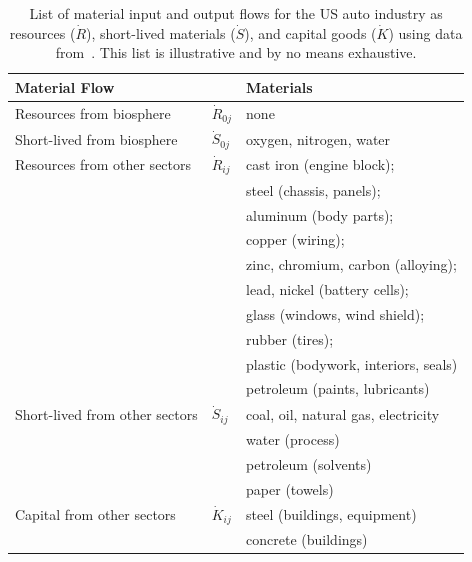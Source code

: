 \begin{table}
\caption[List of material input and output flows for the 
US auto industry]{List of material input and output flows for 
the US auto industry 
as resources ($\dot{R}$),
short-lived materials ($\dot{S}$),
and capital goods ($\dot{K}$)
using data from~\cite{Sullivan1998, MacLean1998,Schweimer2000,
McCleese2002,MacLean2003, Burnham2006,Sullivan2010, Hawkins2012}.
This list is illustrative and by no means exhaustive.}
\begin{center}
 \begin{tabular}{p{4cm}p{1cm}p{5.2cm}}
\toprule 
\textbf{Material Flow}		 		& 								& \textbf{Materials} 									\\
\midrule
Resources from biosphere		& $\dot{R}_{0j}$		& none															\\[0.15cm]
Short-lived from biosphere		&	$\dot{S}_{0j}$	& oxygen, nitrogen, water							\\
\midrule
Resources from other sectors	& $\dot{R}_{ij}$		&	 cast iron (engine block);							\\
												&								&	 steel (chassis, panels);							\\
												&								&	 aluminum (body parts); 							\\		
												&								&	 copper (wiring);										\\	
												&								&	 zinc, chromium, carbon (alloying); 			\\
												&								&	 lead, nickel (battery cells);		 				\\
												&								&	 glass (windows, wind shield);					\\
												&								&	 rubber (tires);											\\
												&								&	 plastic (bodywork, interiors, seals)			\\
												&								&	 petroleum (paints, lubricants)					\\[0.15cm]
Short-lived from other sectors	& $\dot{S}_{ij}$		&	 coal, oil, natural gas, electricity				\\
												&								&	 water (process)										\\
												&								&	 petroleum (solvents)								\\
												&								&	 paper (towels)										\\[0.15cm]
Capital from other sectors		& $\dot{K}_{ij}$		&	 steel (buildings, equipment)					\\
												&								&	 concrete (buildings)								\\

\end{tabular}
\end{center}
\end{table}
